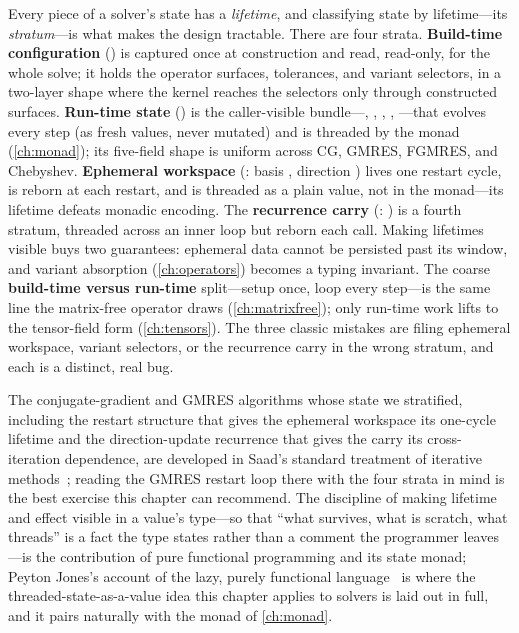 \summarysection
Every piece of a solver's state has a \emph{lifetime}, and classifying state by
lifetime---its \emph{stratum}---is what makes the design tractable. There are
four strata. \textbf{Build-time configuration} () is captured once
at construction and read, read-only, for the whole solve; it holds the operator
surfaces, tolerances, and variant selectors, in a two-layer shape where the
kernel reaches the selectors only through constructed surfaces. \textbf{Run-time
state} () is the caller-visible bundle---, ,
, , ---that evolves every step
(as fresh values, never mutated) and is threaded by the  monad
(\cref{ch:monad}); its five-field shape is uniform across CG, GMRES, FGMRES, and
Chebyshev. \textbf{Ephemeral workspace} (: basis ,
direction ) lives one restart cycle, is reborn at each restart, and is
threaded as a plain value, not in the monad---its lifetime defeats monadic
encoding. The \textbf{recurrence carry} (: ) is
a fourth stratum, threaded across an inner loop but reborn each call. Making
lifetimes visible buys two guarantees: ephemeral data cannot be persisted past
its window, and variant absorption (\cref{ch:operators}) becomes a typing
invariant. The coarse \textbf{build-time versus run-time} split---setup once,
loop every step---is the same line the matrix-free operator draws
(\cref{ch:matrixfree}); only run-time work lifts to the tensor-field form
(\cref{ch:tensors}). The three classic mistakes are filing ephemeral workspace,
variant selectors, or the recurrence carry in the wrong stratum, and each is a
distinct, real bug.

\furtherreading
The conjugate-gradient and GMRES algorithms whose state we stratified, including
the restart structure that gives the ephemeral workspace its one-cycle lifetime
and the direction-update recurrence that gives the carry its cross-iteration
dependence, are developed in Saad's standard treatment of iterative
methods~\citep{saad2003}; reading the GMRES restart loop there with the four
strata in mind is the best exercise this chapter can recommend. The discipline of
making lifetime and effect visible in a value's type---so that ``what survives,
what is scratch, what threads'' is a fact the type states rather than a comment
the programmer leaves---is the contribution of pure functional programming and
its state monad; Peyton Jones's account of the lazy, purely functional
language~\citep{peytonjones2003} is where the threaded-state-as-a-value idea this
chapter applies to solvers is laid out in full, and it pairs naturally with the
monad of \cref{ch:monad}.

